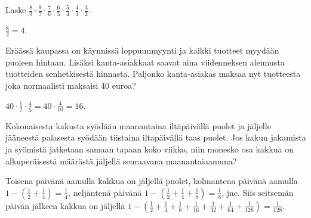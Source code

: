     \begin{tehtava}
        Laske 
        $\frac{8}{9}\cdot \frac{9}{7} \cdot \frac{7}{6} \cdot \frac{6}{5}
            \cdot \frac{5}{4} \cdot \frac{4}{3} \cdot \frac{3}{2}$.
        
        \begin{vastaus}
            $\frac{8}{2}=4$.
        \end{vastaus}        
    \end{tehtava}
    
    \begin{tehtava}
    	Eräässä kaupassa on käynnissä loppuunmyynti ja kaikki tuotteet
        myydään puoleen hintaan. Lisäksi kanta-asiakkaat saavat aina
        viidenneksen alennusta tuotteiden senhetkisestä hinnasta.
    	Paljonko kanta-asiakas maksaa nyt tuotteesta joka normaalisti
        maksaisi 40 euroa?
    	\begin{vastaus}
    	$40\cdot \frac{1}{2} \cdot \frac{4}{5}=40\cdot \frac{4}{10}= 16$. 
    	\end{vastaus}
    \end{tehtava}
    
    \begin{tehtava}
        Kokonaisesta kakusta syödään maanantaina iltäpäivällä puolet ja jäljelle
        jääneestä palasesta syödään tiistaina 	iltapäivällä taas puolet.
        Jos kakun jakamista ja syömistä jatketaan samaan tapaan koko viikko, niin monesko 
        osa kakkua on alkuperäisestä määrästä jäljellä seuraavana maanantaiaamuna?
        
        \begin{vastaus}
            Toisena päivänä aamulla kakkua on jäljellä puolet, kolmantena
            päivänä aamulla
                $1-\left(\frac{1}{2} + \frac{1}{4}\right) = \frac{1}{4}$, 
            neljäntenä päivänä
                $1-\left(\frac{1}{2} + \frac{1}{4} + \frac{1}{8}\right)
                = \frac{1}{8}$, jne.
            Siis seitsemän päivän jälkeen kakkua on jäljellä
                $1-\left(\frac{1}{2} + \frac{1}{4} + \frac{1}{8} +
                \frac{1}{16} + \frac{1}{32} + \frac{1}{64} + \frac{1}{128}\right)
                = \frac{1}{128}$.  
        \end{vastaus}
    \end{tehtava}

